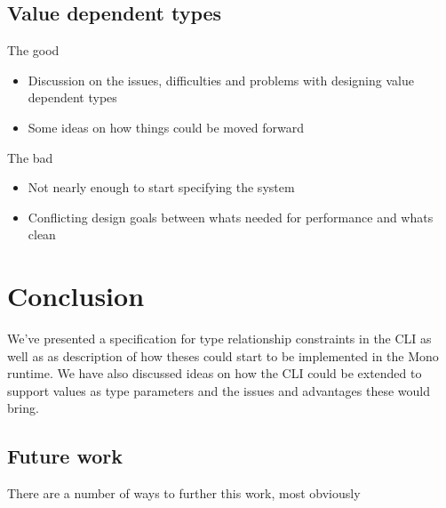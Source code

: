 \documentclass[english]{report}
\begin{document}
\section{Value dependent types}

The good
\begin{itemize}
	\item Discussion on the issues, difficulties and problems with designing value dependent types
	\item Some ideas on how things could be moved forward
\end{itemize}

The bad
\begin{itemize}
	\item Not nearly enough to start specifying the system
	\item Conflicting design goals between whats needed for performance and whats clean
\end{itemize}

\chapter{Conclusion}

We've presented a specification for type relationship constraints in the CLI as well as 
as description of how theses could start to be implemented in the Mono runtime. We have 
also discussed ideas on how the CLI could be extended to support values as type parameters
and the issues and advantages these would bring.

\section{Future work}

There are a number of ways to further this work, most obviously 




\end{document}

